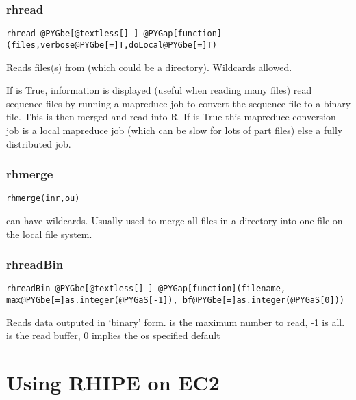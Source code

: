 \documentclass[letterpaper,10pt,english]{manual}
\begin{document}
\subsection{rhread}

\begin{Verbatim}[commandchars=@\[\]]
rhread @PYGbe[@textless[]-] @PYGap[function](files,verbose@PYGbe[=]T,doLocal@PYGbe[=]T)
\end{Verbatim}

Reads files(s) from  (which could be a directory). Wildcards allowed.

If  is True, information is displayed (useful when reading many
files)
 read sequence files by running a mapreduce   job to convert the
sequence file to a binary file.
This is then merged and read into R. If  is True this mapreduce
conversion job is a local mapreduce job (which can be slow for lots of part
files) else a fully distributed job.


\subsection{rhmerge}

\begin{Verbatim}[commandchars=@\[\]]
rhmerge(inr,ou)
\end{Verbatim}

 can have wildcards. Usually used to merge all files in a directory into one file  on the local file system.


\subsection{rhreadBin}

\begin{Verbatim}[commandchars=@\[\]]
rhreadBin @PYGbe[@textless[]-] @PYGap[function](filename, max@PYGbe[=]as.integer(@PYGaS[-1]), bf@PYGbe[=]as.integer(@PYGaS[0]))
\end{Verbatim}

Reads data outputed in `binary' form.  is the maximum number to read, -1
is all.  is the read buffer, 0 implies the os specified default 

\resetcurrentobjects
\hypertarget{--doc-ec2}{}

\chapter{Using RHIPE on EC2}
\end{document}
